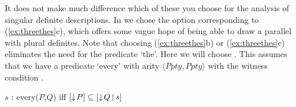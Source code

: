 
 

 
   
 

 

 
   
It does not make much difference which of these you choose for the
analysis of singular definite descriptions.  In \cite{Cooper2013b} we
chose the option corresponding to (\ref{ex:threethes}c), which offers
some vague hope of being able to draw a parallel with plural
definites.  Note that choosing (\ref{ex:threethes}b) or
(\ref{ex:threethes}c) eliminates the need for the predicate `the'.
Here we will choose .  This assumes that we have a predicate
`every' with arity $\langle\textit{Ppty},\textit{Ppty}\rangle$ with
the witness condition \nexteg{}.
\begin{ex} 
 $s$ : every($P$,$Q$) iff
 $[\downarrow\!P]\subseteq[\downarrow\!Q\!\restriction\!s]$
 \label{ex:witcond-every}
\end{ex} 
  

